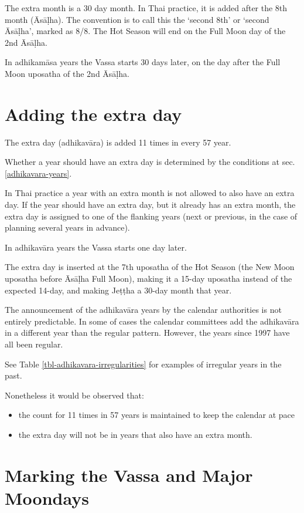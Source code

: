 \documentclass[11pt,oneside]{memoir-article}
\begin{document}
The extra month is a 30 day month. In Thai practice, it is added after the 8th
month (Āsāḷha). The convention is to call this the `second 8th' or `second
Āsāḷha', marked as 8/8. The Hot Season will end on the Full Moon day of the 2nd
Āsāḷha.

In adhikamāsa years the Vassa starts 30 days later, on the day after the Full
Moon uposatha of the 2nd Āsāḷha.

\section{Adding the extra day}
\label{sec-2-2}
\label{adding-extra-day}

The extra day (adhikavāra) is added 11 times in every 57 year.

Whether a year should have an extra day is determined by the conditions at
sec. \ref{adhikavara-years}.

In Thai practice a year with an extra month is not allowed to also
have an extra day. If the year should have an extra day, but it
already has an extra month, the extra day is assigned to one of the
flanking years (next or previous, in the case of planning several
years in advance).

In adhikavāra years the Vassa starts one day later.

The extra day is inserted at the 7th uposatha of the Hot Season (the New Moon
uposatha before Āsāḷha Full Moon), making it a 15-day uposatha instead of the
expected 14-day, and making Jeṭṭha a 30-day month that
year.\autocite{hasapannyo-zodiac}

The announcement of the adhikavāra years by the calendar authorities is not
entirely predictable. In some of cases the calendar committees add the
adhikavāra in a different year than the regular pattern. However, the years
since 1997 have all been regular.

See Table \ref{tbl-adhikavara-irregularities} for examples of irregular years in the past.

Nonetheless it would be observed that:

\begin{itemize}
\item the count for 11 times in 57 years is maintained to keep the
calendar at pace
\item the extra day will not be in years that also have an extra month.
\end{itemize}

\section{Marking the Vassa and Major Moondays}
\label{sec-2-3}
\end{document}
